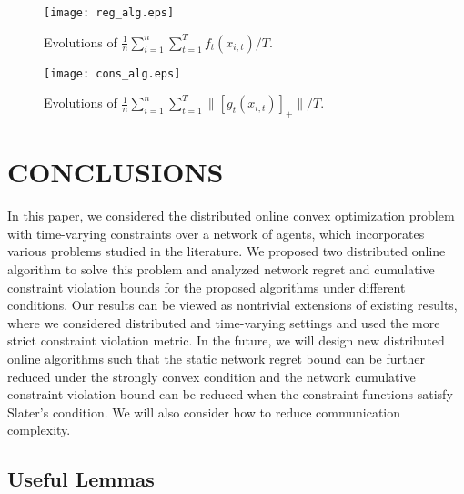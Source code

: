 \documentclass[12pt,draftcls,onecolumn]{IEEEtran}%
\begin{document}
\begin{figure}
  \centering
  \texttt{[image: reg\_alg.eps]}
\caption{Evolutions of $\frac{1}{n}\sum_{i=1}^{n}\sum_{t=1}^{T}f_t(x_{i,t})/T$.}
\label{online_op:fig:reg_alg}
\end{figure}

\begin{figure}
  \centering
  \texttt{[image: cons\_alg.eps]}
\caption{Evolutions of $\frac{1}{n}\sum_{i=1}^n\sum_{t=1}^T\|[g_{t}(x_{i,t})]_+\|/T$.}
\label{online_op:fig:cons_alg}
\end{figure}




\section{CONCLUSIONS}\label{online_opsec:conclusion}
In this paper, we considered the distributed online convex optimization problem with time-varying constraints over a network of agents, which incorporates various problems studied in the literature. We proposed two distributed online algorithm to solve this problem and analyzed network regret and cumulative constraint violation bounds for the proposed algorithms under different conditions. Our results can be viewed as nontrivial extensions of existing results, where we considered  distributed and time-varying settings and used the more strict constraint violation metric. In the future, we will design new distributed online algorithms such that the static network regret bound can be further reduced under the strongly convex condition and the network cumulative constraint violation bound can be reduced when the constraint functions satisfy Slater's condition. We will also consider how to reduce communication complexity.









\appendix\label{online_op:appendix}
\subsection{Useful Lemmas}\label{online_op:app-lemmas}
\end{document}
